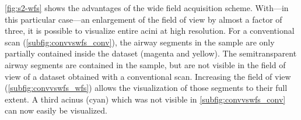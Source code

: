 \autoref{fig:s2-wfs} shows the advantages of the wide field acquisition scheme. With---in this particular case---an enlargement of the field of view by almost a factor of three, it is possible to visualize entire acini at high resolution. For a conventional scan (\autoref{subfig:convvswfs_conv}), the airway segments in the sample are only partially contained inside the dataset (magenta and yellow). The semitransparent airway segments are contained in the sample, but are not visible in the field of view of a dataset obtained with a conventional scan. Increasing the field of view (\autoref{subfig:convvswfs_wfs}) allows the visualization of those segments to their full extent. A third acinus (cyan) which was not visible in \autoref{subfig:convvswfs_conv} can now easily be visualized.

\renewcommand{\imsize}{\linewidth}%
\pgfmathsetlength{\imagewidth}{\imsize}%
%
\def\x{852}%
\def\y{898}%
